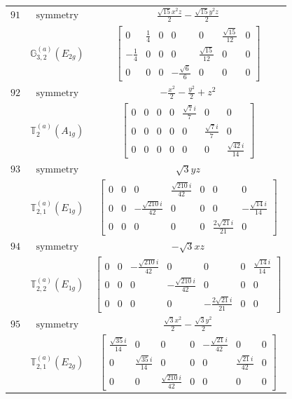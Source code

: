 \documentclass[fleqn,8pt,landscape]{jsarticle}
\begin{document}
\begin{longtable}{ccc}
$ 91 $ & $ \text{symmetry} $ & $ \frac{\sqrt{15} x^{2} z}{2} - \frac{\sqrt{15} y^{2} z}{2} $ \\
$  $ & $ \mathbb{G}_{3,2}^{(a)}(E_{2g}) $ & $ \begin{bmatrix} 0 & \frac{1}{4} & 0 & 0 & 0 & \frac{\sqrt{15}}{12} & 0 \\ - \frac{1}{4} & 0 & 0 & 0 & \frac{\sqrt{15}}{12} & 0 & 0 \\ 0 & 0 & 0 & - \frac{\sqrt{6}}{6} & 0 & 0 & 0 \end{bmatrix} $ \\ \hline
$ 92 $ & $ \text{symmetry} $ & $ - \frac{x^{2}}{2} - \frac{y^{2}}{2} + z^{2} $ \\
$  $ & $ \mathbb{T}_{2}^{(a)}(A_{1g}) $ & $ \begin{bmatrix} 0 & 0 & 0 & 0 & \frac{\sqrt{7} i}{7} & 0 & 0 \\ 0 & 0 & 0 & 0 & 0 & \frac{\sqrt{7} i}{7} & 0 \\ 0 & 0 & 0 & 0 & 0 & 0 & \frac{\sqrt{42} i}{14} \end{bmatrix} $ \\ \hline
$ 93 $ & $ \text{symmetry} $ & $ \sqrt{3} y z $ \\
$  $ & $ \mathbb{T}_{2,1}^{(a)}(E_{1g}) $ & $ \begin{bmatrix} 0 & 0 & 0 & \frac{\sqrt{210} i}{42} & 0 & 0 & 0 \\ 0 & 0 & - \frac{\sqrt{210} i}{42} & 0 & 0 & 0 & - \frac{\sqrt{14} i}{14} \\ 0 & 0 & 0 & 0 & 0 & \frac{2 \sqrt{21} i}{21} & 0 \end{bmatrix} $ \\ \hline
$ 94 $ & $ \text{symmetry} $ & $ - \sqrt{3} x z $ \\
$  $ & $ \mathbb{T}_{2,2}^{(a)}(E_{1g}) $ & $ \begin{bmatrix} 0 & 0 & - \frac{\sqrt{210} i}{42} & 0 & 0 & 0 & \frac{\sqrt{14} i}{14} \\ 0 & 0 & 0 & - \frac{\sqrt{210} i}{42} & 0 & 0 & 0 \\ 0 & 0 & 0 & 0 & - \frac{2 \sqrt{21} i}{21} & 0 & 0 \end{bmatrix} $ \\ \hline
$ 95 $ & $ \text{symmetry} $ & $ \frac{\sqrt{3} x^{2}}{2} - \frac{\sqrt{3} y^{2}}{2} $ \\
$  $ & $ \mathbb{T}_{2,1}^{(a)}(E_{2g}) $ & $ \begin{bmatrix} \frac{\sqrt{35} i}{14} & 0 & 0 & 0 & - \frac{\sqrt{21} i}{42} & 0 & 0 \\ 0 & \frac{\sqrt{35} i}{14} & 0 & 0 & 0 & \frac{\sqrt{21} i}{42} & 0 \\ 0 & 0 & \frac{\sqrt{210} i}{42} & 0 & 0 & 0 & 0 \end{bmatrix} $ \\ \hline

\end{longtable}
\end{document}
